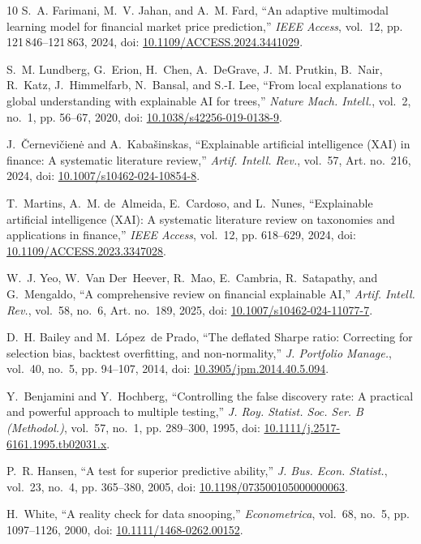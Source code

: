\documentclass[conference]{IEEEtran}
\begin{document}
\begin{thebibliography}{10}
S.~A. Farimani, M.~V. Jahan, and A.~M. Fard, ``An adaptive multimodal learning
  model for financial market price prediction,'' \emph{IEEE Access}, vol.~12,
  pp. 121\,846--121\,863, 2024, doi: \url{10.1109/ACCESS.2024.3441029}.

S.~M. Lundberg, G.~Erion, H.~Chen, A.~DeGrave, J.~M. Prutkin, B.~Nair, R.~Katz,
  J.~Himmelfarb, N.~Bansal, and S.-I. Lee, ``From local explanations to global
  understanding with explainable {AI} for trees,'' \emph{Nature Mach. Intell.},
  vol.~2, no.~1, pp. 56--67, 2020, doi: \url{10.1038/s42256-019-0138-9}.

J.~{\v{C}}ernevi{\v{c}}ien{\.{e}} and A.~Kaba{\v{s}}inskas, ``Explainable
  artificial intelligence ({XAI}) in finance: A systematic literature review,''
  \emph{Artif. Intell. Rev.}, vol.~57, Art. no.~216, 2024, doi:
  \url{10.1007/s10462-024-10854-8}.

T.~Martins, A.~M. de~Almeida, E.~Cardoso, and L.~Nunes, ``Explainable
  artificial intelligence ({XAI}): A systematic literature review on taxonomies
  and applications in finance,'' \emph{IEEE Access}, vol.~12, pp. 618--629,
  2024, doi: \url{10.1109/ACCESS.2023.3347028}.

W.~J. Yeo, W.~Van Der~Heever, R.~Mao, E.~Cambria, R.~Satapathy, and
  G.~Mengaldo, ``A comprehensive review on financial explainable {AI},''
  \emph{Artif. Intell. Rev.}, vol.~58, no.~6, Art. no.~189, 2025, doi:
  \url{10.1007/s10462-024-11077-7}.

D.~H. Bailey and M.~L{\'o}pez~de Prado, ``The deflated {Sharpe} ratio:
  Correcting for selection bias, backtest overfitting, and non-normality,''
  \emph{J. Portfolio Manage.}, vol.~40, no.~5, pp. 94--107, 2014, doi:
  \url{10.3905/jpm.2014.40.5.094}.

Y.~Benjamini and Y.~Hochberg, ``Controlling the false discovery rate: A
  practical and powerful approach to multiple testing,'' \emph{J. Roy. Statist.
  Soc. Ser. B (Methodol.)}, vol.~57, no.~1, pp. 289--300, 1995, doi:
  \url{10.1111/j.2517-6161.1995.tb02031.x}.

P.~R. Hansen, ``A test for superior predictive ability,'' \emph{J. Bus. Econ.
  Statist.}, vol.~23, no.~4, pp. 365--380, 2005, doi:
  \url{10.1198/073500105000000063}.

H.~White, ``A reality check for data snooping,'' \emph{Econometrica}, vol.~68,
  no.~5, pp. 1097--1126, 2000, doi: \url{10.1111/1468-0262.00152}.


\end{thebibliography}
\end{document}
